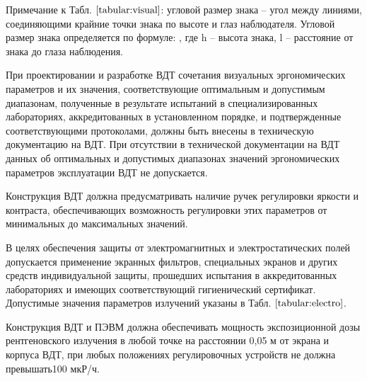 \documentclass[12pt,a4paper]{report}
\begin{document}
Примечание к Табл. $\ref{tabular:visual}$: угловой размер знака – угол между линиями, соединяющими крайние точки знака по высоте и глаз наблюдателя. Угловой размер знака определяется по формуле:  , где h – высота знака, l – расстояние от знака до глаза наблюдения.

При проектировании и разработке ВДТ сочетания визуальных эргономических параметров и их значения, соответствующие оптимальным и допустимым диапазонам, полученные в результате испытаний в специализированных лабораториях, аккредитованных в установленном порядке, и подтвержденные соответствующими протоколами, должны быть внесены в техническую документацию на ВДТ. При отсутствии в технической документации на ВДТ данных об оптимальных и допустимых диапазонах значений эргономических параметров эксплуатации ВДТ не допускается. 

Конструкция ВДТ должна предусматривать наличие ручек регулировки яркости и контраста, обеспечивающих возможность регулировки этих параметров от минимальных до максимальных значений. 

В целях обеспечения защиты от электромагнитных и электростатических полей допускается применение экранных фильтров, специальных экранов и других средств индивидуальной защиты, прошедших испытания в аккредитованных лабораториях и имеющих соответствующий гигиенический сертификат. Допустимые значения параметров излучений указаны в Табл. $\ref{tabular:electro}$.

Конструкция ВДТ и ПЭВМ должна обеспечивать мощность экспозиционной дозы рентгеновского излучения в любой точке на расстоянии 0,05 м от экрана и корпуса ВДТ, при любых положениях регулировочных устройств не должна превышать100 мкР/ч.
\end{document}
